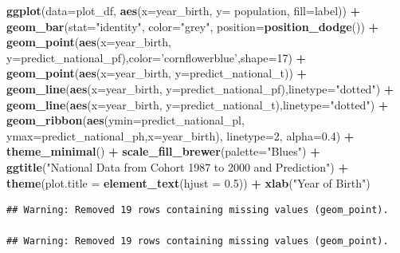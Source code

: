 \documentclass[]{article}
\newenvironment{Shaded}{\begin{snugshade}}{\end{snugshade}}
\newcommand{\KeywordTok}[1]{\textcolor[rgb]{0.13,0.29,0.53}{\textbf{#1}}}
\newcommand{\DataTypeTok}[1]{\textcolor[rgb]{0.13,0.29,0.53}{#1}}
\newcommand{\DecValTok}[1]{\textcolor[rgb]{0.00,0.00,0.81}{#1}}
\newcommand{\FloatTok}[1]{\textcolor[rgb]{0.00,0.00,0.81}{#1}}
\newcommand{\StringTok}[1]{\textcolor[rgb]{0.31,0.60,0.02}{#1}}
\newcommand{\OperatorTok}[1]{\textcolor[rgb]{0.81,0.36,0.00}{\textbf{#1}}}
\newcommand{\NormalTok}[1]{#1}
\begin{document}
\begin{Shaded}
\begin{Highlighting}[]
\KeywordTok{ggplot}\NormalTok{(}\DataTypeTok{data=}\NormalTok{plot_df, }\KeywordTok{aes}\NormalTok{(}\DataTypeTok{x=}\NormalTok{year_birth, }\DataTypeTok{y=}\NormalTok{ population, }\DataTypeTok{fill=}\NormalTok{label)) }\OperatorTok{+}
\StringTok{  }\KeywordTok{geom_bar}\NormalTok{(}\DataTypeTok{stat=}\StringTok{"identity"}\NormalTok{, }\DataTypeTok{color=}\StringTok{"grey"}\NormalTok{, }\DataTypeTok{position=}\KeywordTok{position_dodge}\NormalTok{()) }\OperatorTok{+}
\StringTok{  }\KeywordTok{geom_point}\NormalTok{(}\KeywordTok{aes}\NormalTok{(}\DataTypeTok{x=}\NormalTok{year_birth, }\DataTypeTok{y=}\NormalTok{predict_national_pf),}\DataTypeTok{color=}\StringTok{'cornflowerblue'}\NormalTok{,}\DataTypeTok{shape=}\DecValTok{17}\NormalTok{) }\OperatorTok{+}
\StringTok{  }\KeywordTok{geom_point}\NormalTok{(}\KeywordTok{aes}\NormalTok{(}\DataTypeTok{x=}\NormalTok{year_birth, }\DataTypeTok{y=}\NormalTok{predict_national_t)) }\OperatorTok{+}
\StringTok{  }\KeywordTok{geom_line}\NormalTok{(}\KeywordTok{aes}\NormalTok{(}\DataTypeTok{x=}\NormalTok{year_birth, }\DataTypeTok{y=}\NormalTok{predict_national_pf),}\DataTypeTok{linetype=}\StringTok{"dotted"}\NormalTok{) }\OperatorTok{+}
\StringTok{  }\KeywordTok{geom_line}\NormalTok{(}\KeywordTok{aes}\NormalTok{(}\DataTypeTok{x=}\NormalTok{year_birth, }\DataTypeTok{y=}\NormalTok{predict_national_t),}\DataTypeTok{linetype=}\StringTok{"dotted"}\NormalTok{) }\OperatorTok{+}
\StringTok{  }\KeywordTok{geom_ribbon}\NormalTok{(}\KeywordTok{aes}\NormalTok{(}\DataTypeTok{ymin=}\NormalTok{predict_national_pl, }\DataTypeTok{ymax=}\NormalTok{predict_national_ph,}\DataTypeTok{x=}\NormalTok{year_birth), }\DataTypeTok{linetype=}\DecValTok{2}\NormalTok{, }\DataTypeTok{alpha=}\FloatTok{0.4}\NormalTok{) }\OperatorTok{+}
\StringTok{    }\KeywordTok{theme_minimal}\NormalTok{() }\OperatorTok{+}
\StringTok{    }\KeywordTok{scale_fill_brewer}\NormalTok{(}\DataTypeTok{palette=}\StringTok{"Blues"}\NormalTok{) }\OperatorTok{+}
\StringTok{    }\KeywordTok{ggtitle}\NormalTok{(}\StringTok{"National Data from Cohort 1987 to 2000 and Prediction"}\NormalTok{) }\OperatorTok{+}
\StringTok{    }\KeywordTok{theme}\NormalTok{(}\DataTypeTok{plot.title =} \KeywordTok{element_text}\NormalTok{(}\DataTypeTok{hjust =} \FloatTok{0.5}\NormalTok{)) }\OperatorTok{+}
\StringTok{    }\KeywordTok{xlab}\NormalTok{(}\StringTok{"Year of Birth"}\NormalTok{)}
\end{Highlighting}
\end{Shaded}

\begin{verbatim}
## Warning: Removed 19 rows containing missing values (geom_point).

## Warning: Removed 19 rows containing missing values (geom_point).
\end{verbatim}
\end{document}
